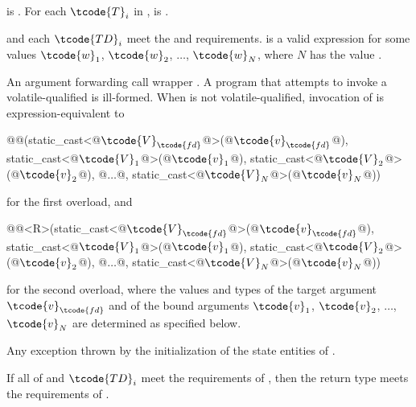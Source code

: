 \begin{itemdescr}
\pnum
\mandates
{} is . For each $\tcode{T}_i$
in ,  is .

\pnum
\expects
{} and each $\tcode{TD}_i$ meet
the  and  requirements.
 is a valid expression for some
values $\tcode{w}_1$, $\tcode{w}_2$, $\dotsc{}$, $\tcode{w}_N$, where
$N$ has the value .

\pnum
\returns
An argument forwarding call wrapper .
A program that attempts to invoke a volatile-qualified 
is ill-formed.
When  is not volatile-qualified, invocation of
is expression-equivalent to
\begin{codeblock}
@@(static_cast<@$\tcode{V}_\tcode{fd}$@>(@$\tcode{v}_\tcode{fd}$@),
       static_cast<@$\tcode{V}_1$@>(@$\tcode{v}_1$@), static_cast<@$\tcode{V}_2$@>(@$\tcode{v}_2$@), @$\dotsc$@, static_cast<@$\tcode{V}_N$@>(@$\tcode{v}_N$@))
\end{codeblock}
for the first overload, and
\begin{codeblock}
@@<R>(static_cast<@$\tcode{V}_\tcode{fd}$@>(@$\tcode{v}_\tcode{fd}$@),
          static_cast<@$\tcode{V}_1$@>(@$\tcode{v}_1$@), static_cast<@$\tcode{V}_2$@>(@$\tcode{v}_2$@), @$\dotsc$@, static_cast<@$\tcode{V}_N$@>(@$\tcode{v}_N$@))
\end{codeblock}
for the second overload,
where the values and types of the target argument $\tcode{v}_\tcode{fd}$ and
of the bound arguments
$\tcode{v}_1$, $\tcode{v}_2$, $\dotsc$, $\tcode{v}_N$ are determined as specified below.

\pnum
\throws
Any exception thrown by the initialization of
the state entities of .

\pnum
\begin{note}
If all of  and $\tcode{TD}_i$ meet
the requirements of , then
the return type meets the requirements of .
\end{note}
\end{itemdescr}

